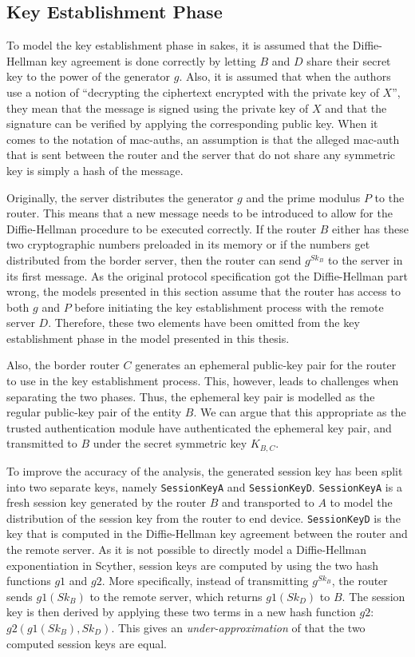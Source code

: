 \subsection{Key Establishment Phase}
\label{subsec:sakes-keys}
To model the key establishment phase in \gls{sakes}, it is assumed that the Diffie-Hellman key agreement is done correctly by letting $B$ and $D$ share their secret key to the power of the generator $g$. Also, it is assumed that when the authors use a notion of ``decrypting the ciphertext encrypted with the private key of $X$'', they mean that the message is signed using the private key of $X$ and that the signature can be verified by applying the corresponding public key. When it comes to the notation of \gls{mac-auth}s, an assumption is that the alleged \gls{mac-auth} that is sent between the router and the server that do not share any symmetric key is simply a hash of the message.

Originally, the server distributes the generator $g$ and the prime modulus $P$ to the router. This means that a new message needs to be introduced to allow for the Diffie-Hellman procedure to be executed correctly. If the router $B$ either has these two cryptographic numbers preloaded in its memory or if the numbers get distributed from the border server, then the router can send $g^{Sk_B}$ to the server in its first message. As the original protocol specification got the Diffie-Hellman part wrong, the models presented in this section assume that the router has access to both $g$ and $P$ before initiating the key establishment process with the remote server $D$. Therefore, these two elements have been omitted from the key establishment phase in the model presented in this thesis.


Also, the border router $C$ generates an ephemeral public-key pair for the router to use in the key establishment process. This, however, leads to challenges when separating the two phases. Thus, the ephemeral key pair is modelled as the regular public-key pair of the entity $B$. We can argue that this appropriate as the trusted authentication module have authenticated the ephemeral key pair, and transmitted to $B$ under the secret symmetric key $K_{B,C}$.


To improve the accuracy of the analysis, the generated session key has been split into two separate keys, namely \texttt{SessionKeyA} and \texttt{SessionKeyD}. \texttt{SessionKeyA} is a fresh session key generated by the router $B$ and transported to $A$ to model the distribution of the session key from the router to end device. \texttt{SessionKeyD} is the key that is computed in the Diffie-Hellman key agreement between the router and the remote server. As it is not possible to directly model a Diffie-Hellman exponentiation in Scyther, session keys are computed by using the two hash functions $g1$ and $g2$. More specifically, instead of transmitting $g^{Sk_B}$, the router sends $g1(Sk_B)$ to the remote server, which returns $g1(Sk_D)$ to $B$. The session key is then derived by applying these two terms in a new hash function $g2$: $g2(g1(Sk_B), Sk_D)$. This gives an \emph{under-approximation} of that the two computed session keys are equal.


